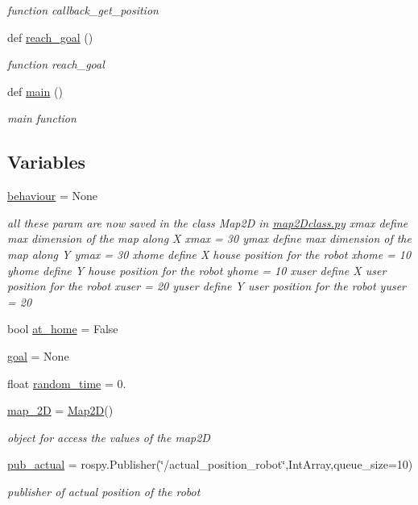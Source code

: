 \begin{DoxyCompactItemize}
\begin{DoxyCompactList}\small\item\em function callback\+\_\+get\+\_\+position \end{DoxyCompactList}\item 
def \hyperlink{namespacemotion_a58accc2356096af3ae30fe9442a1a482}{reach\+\_\+goal} ()
\begin{DoxyCompactList}\small\item\em function reach\+\_\+goal \end{DoxyCompactList}\item 
def \hyperlink{namespacemotion_ad6289fca8572f5af95fd28f4c2dbc68d}{main} ()
\begin{DoxyCompactList}\small\item\em main function \end{DoxyCompactList}\end{DoxyCompactItemize}
\subsection*{Variables}
\begin{DoxyCompactItemize}
\item 
\hyperlink{namespacemotion_a15d63b2a70ac940f179085ce72871c86}{behaviour} = None
\begin{DoxyCompactList}\small\item\em all these param are now saved in the class Map2D in \hyperlink{map2Dclass_8py}{map2\+Dclass.\+py} xmax define max dimension of the map along X xmax = 30 ymax define max dimension of the map along Y ymax = 30 xhome define X house position for the robot xhome = 10 yhome define Y house position for the robot yhome = 10 xuser define X user position for the robot xuser = 20 yuser define Y user position for the robot yuser = 20 \end{DoxyCompactList}\item 
bool \hyperlink{namespacemotion_a30e58643e988d1faddb84cdfd54965f8}{at\+\_\+home} = False
\item 
\hyperlink{namespacemotion_a6427953689c120f9b8a1cb3646733b85}{goal} = None
\item 
float \hyperlink{namespacemotion_a577a5f71c1bdf849f48eed17c4134bee}{random\+\_\+time} = 0.
\item 
\hyperlink{namespacemotion_a858c2a633daaa0a83b599397041f524b}{map\+\_\+2D} = \hyperlink{classmap2Dclass_1_1Map2D}{Map2D}()
\begin{DoxyCompactList}\small\item\em object for access the values of the map2D \end{DoxyCompactList}\item 
\hyperlink{namespacemotion_a9213de80f34f408518c9265ee283b588}{pub\+\_\+actual} = rospy.\+Publisher(\char`\"{}/actual\+\_\+position\+\_\+robot\char`\"{},Int\+Array,queue\+\_\+size=10)
\begin{DoxyCompactList}\small\item\em publisher of actual position of the robot \end{DoxyCompactList}\end{DoxyCompactItemize}


